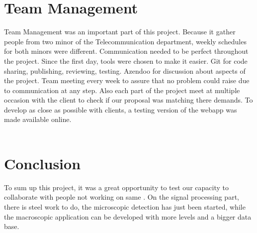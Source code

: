 %
%
\section{Team Management}
Team Management was an important part of this project. Because it gather people from two minor of the Telecommunication department, weekly schedules for both minors were different. Communication needed to be perfect throughout the project. Since the first day, tools were chosen to make it easier. Git for code sharing, publishing, reviewing, testing. Azendoo for discussion about aspects of the project. Team meeting every week to assure that no problem could raise due to communication at any step. Also each part of the project meet at multiple occasion with the client to check if our proposal was matching there demands. To develop as close as possible with clients, a testing version of the webapp was made available online.\\\\

\section{Conclusion}
To sum up this project, it was a great opportunity to test our capacity to collaborate with people not working on same . On the signal processing part, there is steel work to do, the microscopic detection has just been started, while the macroscopic application can be developed with more levels and a bigger data base.
